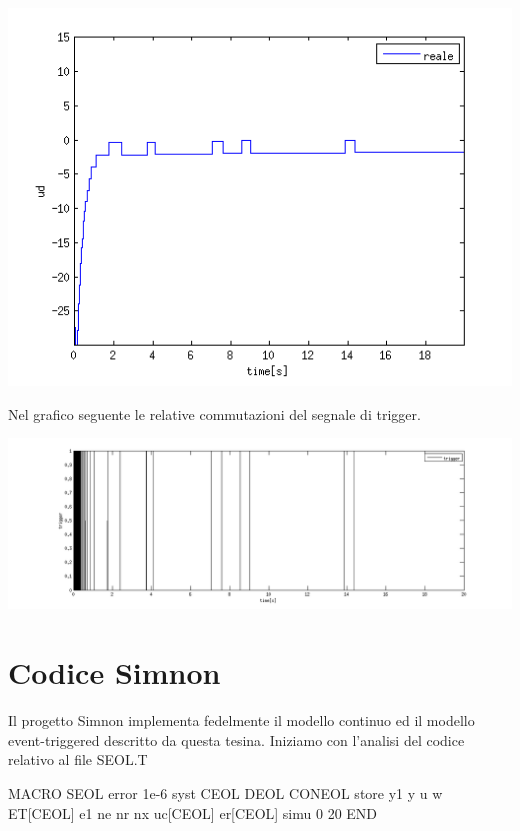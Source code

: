 \documentclass[a4paper,13pt]{article}
\begin{document}
\begin{center}
\includegraphics[scale=0.6]{graph/udiscsin.png}
\end{center}
	Nel grafico seguente le relative commutazioni del segnale di trigger.
\begin{center}
\includegraphics[scale=0.4]{graph/trigger2.png}
\end{center}

\section{Codice Simnon}
Il progetto Simnon implementa fedelmente il modello continuo ed il modello event-triggered descritto da questa tesina.
Iniziamo con l'analisi del codice relativo al file SEOL.T

MACRO SEOL
error 1e-6
syst CEOL DEOL CONEOL
store y1 y u w  ET[CEOL] e1 ne nr nx uc[CEOL] er[CEOL]
simu 0 20
END
\end{document}
